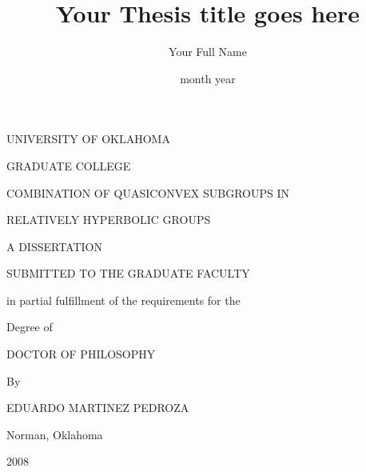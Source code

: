 \documentclass[12pt]{report}
\theoremstyle{definition}
\theoremstyle{remark}
\numberwithin{equation}{chapter}
\numberwithin{figure}{chapter}
\begin{document}
\title{Your Thesis title goes here}
\author{Your Full Name}
\date{month year}

{%

{\singlespacing

\newpage
\thispagestyle{empty}
\begin{center}
{ %
UNIVERSITY OF OKLAHOMA
\par
\vspace{0.16in}
GRADUATE COLLEGE
\par
\vspace{1.2in}
COMBINATION OF QUASICONVEX SUBGROUPS IN
\par
\vspace{0.17in}
RELATIVELY HYPERBOLIC GROUPS
\par
\vspace{1.2in}
A DISSERTATION
\par
\vspace{0.17in}
SUBMITTED TO THE GRADUATE FACULTY
\par
\vspace{0.17in}
in partial fulfillment of the requirements for the
\par
\vspace{0.17in}
Degree of
\par
\vspace{0.17in}
DOCTOR OF PHILOSOPHY
\par
\vfill
By
\par
\vspace{0.17in}
EDUARDO MARTINEZ PEDROZA
\par
Norman, Oklahoma
\par
2008
}
\end{center}


}}
\end{document}
